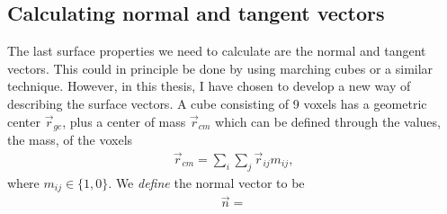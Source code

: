 \subsection{Calculating normal and tangent vectors}
The last surface properties we need to calculate are the normal and tangent vectors. This could in principle be done by using marching cubes \cite{article:marching_cubes_original} or a similar technique. However, in this thesis, I have chosen to develop a new way of describing the surface vectors. A cube consisting of 9 voxels has a geometric center $\vec r_{gc}$, plus a center of mass $\vec r_{cm}$ which can be defined through the values, the mass, of the voxels
\begin{align}
	\vec r_{cm} = \sum_i\sum_j \vec r_{ij}m_{ij},
\end{align}
where $m_{ij} \in \{1,0\}$. We \textit{define} the normal vector to be 
\begin{align}
	\vec n = 
\end{align}
